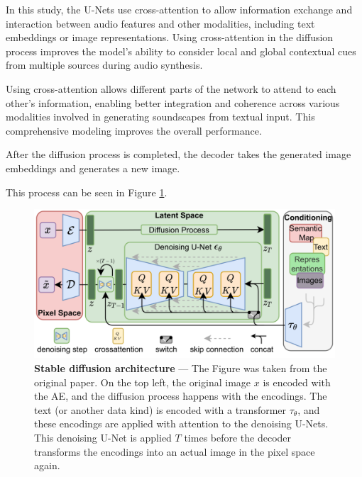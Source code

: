 In this study, the U-Nets use cross-attention to allow information exchange and interaction between audio features and other modalities, including text embeddings or image representations. Using cross-attention in the diffusion process improves the model's ability to consider local and global contextual cues from multiple sources during audio synthesis.

Using cross-attention allows different parts of the network to attend to each other's information, enabling better integration and coherence across various modalities involved in generating soundscapes from textual input. This comprehensive modeling improves the overall performance.

After the diffusion process is completed, the decoder takes the generated image embeddings and generates a new image.

This process can be seen in Figure \ref{fig:stable-diffusion}.

\begin{figure}[ht]
    \centering
    \includegraphics[width=\textwidth]{figures/2-sota/stable-diffusion.png}
    \caption[Stable diffusion architecture]{\textbf{Stable diffusion architecture} --- The Figure was taken from the original paper. On the top left, the original image $x$ is encoded with the \ac{AE}, and the diffusion process happens with the encodings. The text (or another data kind) is encoded with a transformer $\tau_{\theta}$, and these encodings are applied with attention to the denoising U-Nets. This denoising U-Net is applied $T$ times before the decoder transforms the encodings into an actual image in the pixel space again.}
    \label{fig:stable-diffusion}
\end{figure}